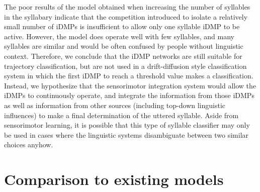 The poor results of the model
obtained when increasing the number
of syllables in the syllabary
indicate that the competition
introduced to isolate a relatively small
number of iDMPs is insufficient
to allow only one syllable iDMP to be active.
However, the model does operate well
with few syllables,
and many syllables are similar
and would be often confused by people
without linguistic context.
Therefore, we conclude that
the iDMP networks are still suitable
for trajectory classification,
but are not used in a
drift-diffusion style classification system
in which the first iDMP to reach
a threshold value makes a classification.
Instead, we hypothesize that
the sensorimotor integration system
would allow the iDMPs to continuously operate,
and integrate the information from those iDMPs
as well as information from other sources
(including top-down linguistic influences)
to make a final determination
of the uttered syllable.
Aside from sensorimotor learning,
it is possible that
this type of syllable classifier
may only be used in cases where
the linguistic systems
disambiguate between two similar choices anyhow.









\section{Comparison to existing models}

